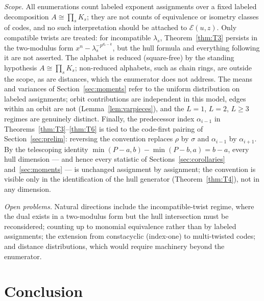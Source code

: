 \documentclass[10pt,journal,draftclsnofoot,onecolumn]{IEEEtran}
\theoremstyle{definition}
\theoremstyle{remark}
\begin{document}
\emph{Scope.} All enumerations count labeled exponent assignments over
a fixed labeled decomposition \(A \cong \prod_s K_s\); they are not
counts of equivalence or isometry classes of codes, and no such
interpretation should be attached to \(\mathcal{E}(u,z)\). Only
compatible twists are treated: for incompatible \(\lambda_s\),
Theorem~\ref{thm:T3} persists in the two-modulus form
\(x^n - \lambda_s^{-p^{d_s-k}}\), but the hull formula and everything
following it are not asserted. The alphabet is reduced (square-free) by
the standing hypothesis \(A \cong \prod_s K_s\); non-reduced alphabets,
such as chain rings, are outside the scope, as are distances, which the
enumerator does not address. The means and variances of
Section~\ref{sec:moments} refer to the uniform distribution on labeled
assignments; orbit contributions are independent in this model, edges
within an orbit are not (Lemma~\ref{lem:varpieces}), and the \(L=1\),
\(L=2\), \(L\ge3\) regimes are genuinely distinct. Finally, the
predecessor index \(\alpha_{i-1}\) in
Theorems~\ref{thm:T3}--\ref{thm:T6} is tied to the code-first pairing of
Section~\ref{sec:prelim}: reversing the convention replaces \(\rho\) by
\(\sigma\) and \(\alpha_{i-1}\) by \(\alpha_{i+1}\). By the telescoping
identity \(\min(P-a,b) - \min(P-b,a) = b - a\), every hull dimension ---
and hence every statistic of Sections~\ref{sec:corollaries}
and~\ref{sec:moments} --- is unchanged assignment by assignment; the
convention is visible only in the identification of the hull generator
(Theorem~\ref{thm:T4}), not in any dimension.

\emph{Open problems.} Natural directions include the incompatible-twist
regime, where the dual exists in a two-modulus form but the hull
intersection must be reconsidered; counting up to monomial equivalence
rather than by labeled assignments; the extension from constacyclic
(index-one) to multi-twisted codes; and distance distributions, which
would require machinery beyond the enumerator.

\section{Conclusion}
\end{document}

